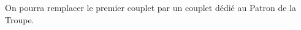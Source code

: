

{\footnotesize On pourra remplacer le premier couplet par un couplet dédié au Patron de la Troupe.}


